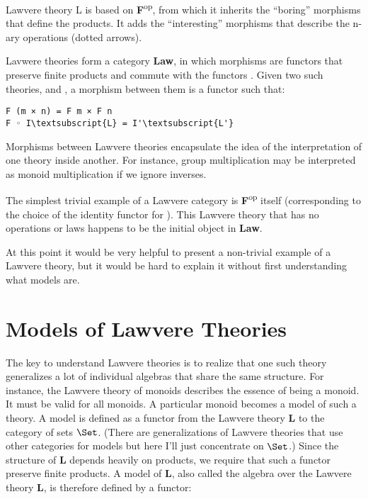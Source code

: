 \noindent
Lawvere theory L is based on \textbf{F}\textsuperscript{op}, from which
it inherits the ``boring'' morphisms that define the products. It adds
the ``interesting'' morphisms that describe the n-ary operations (dotted
arrows).

Lavwere theories form a category \textbf{Law}, in which morphisms are
functors that preserve finite products and commute with the functors
. Given two such theories,  and
, a morphism between them is a
functor  such that:

\begin{Verbatim}[commandchars=\\\{\}]
F (m × n) = F m × F n
F ◦ I\textsubscript{L} = I'\textsubscript{L'}
\end{Verbatim}
Morphisms between Lawvere theories encapsulate the idea of the
interpretation of one theory inside another. For instance, group
multiplication may be interpreted as monoid multiplication if we ignore
inverses.

The simplest trivial example of a Lawvere category is
\textbf{F}\textsuperscript{op} itself (corresponding to the choice of
the identity functor for ). This Lawvere theory that has no
operations or laws happens to be the initial object in \textbf{Law}.

At this point it would be very helpful to present a non-trivial example
of a Lawvere theory, but it would be hard to explain it without first
understanding what models are.

\section{Models of Lawvere Theories}\label{models-of-lawvere-theories}

The key to understand Lawvere theories is to realize that one such
theory generalizes a lot of individual algebras that share the same
structure. For instance, the Lawvere theory of monoids describes the
essence of being a monoid. It must be valid for all monoids. A
particular monoid becomes a model of such a theory. A model is defined
as a functor from the Lawvere theory \textbf{L} to the category of sets
$\Set$. (There are generalizations of Lawvere theories that use
other categories for models but here I'll just concentrate on
$\Set$.) Since the structure of \textbf{L} depends heavily on
products, we require that such a functor preserve finite products. A
model of \textbf{L}, also called the algebra over the Lawvere theory
\textbf{L}, is therefore defined by a functor:

